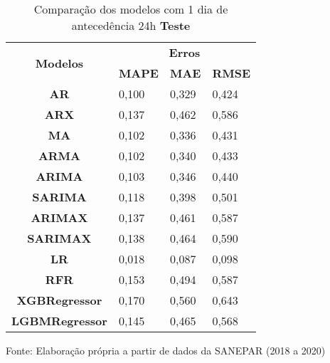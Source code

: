 \begin{table}[H]
	\centering
	\caption{Comparação dos modelos com 1 dia de antecedência 24h \textbf{Teste} }\label{tb:1-24tst}
	\begin{tabular}{@{}clll@{}}
		\toprule
		\multirow{2}{*}{\textbf{Modelos}} & \multicolumn{3}{c}{\textbf{Erros}}                                                                       \\ \cmidrule(l){2-4} 
		& \multicolumn{1}{c}{\textbf{MAPE}} & \multicolumn{1}{c}{\textbf{MAE}} & \multicolumn{1}{c}{\textbf{RMSE}} \\ \hline
\textbf{AR}                       & 0,100                             & 0,329                            & 0,424                             \\
\textbf{ARX}                      & 0,137                             & 0,462                            & 0,586                             \\
\textbf{MA}                       & 0,102                             & 0,336                            & 0,431                             \\
\textbf{ARMA}                     & 0,102                             & 0,340                            & 0,433                             \\
\textbf{ARIMA}                    & 0,103                             & 0,346                            & 0,440                             \\
\textbf{SARIMA}                   & 0,118                             & 0,398                            & 0,501                             \\
\textbf{ARIMAX}                   & 0,137                             & 0,461                            & 0,587                             \\
\textbf{SARIMAX}                  & 0,138                             & 0,464                            & 0,590                             \\
\textbf{LR}                       & 0,018                             & 0,087                            & 0,098                             \\
\textbf{RFR}                      & 0,153                             & 0,494                            & 0,587                             \\
\textbf{XGBRegressor}             & 0,170                             & 0,560                            & 0,643                             \\
\textbf{LGBMRegressor}            & 0,145                             & 0,465                            & 0,568                             \\ \bottomrule
	\end{tabular}

Fonte: Elaboração própria a partir de dados da SANEPAR (2018 a 2020)
\end{table}

